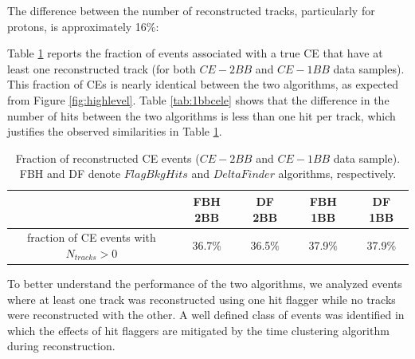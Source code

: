 The difference between the number of 
reconstructed tracks, particularly 
for protons, is approximately 16\%:  

Table \ref{tab:recoeffcele} reports 
the fraction of events associated 
with a true CE that have at least one 
reconstructed track (for both 
$CE-2BB$ and $CE-1BB$ data samples). 
This fraction of CEs is nearly identical 
between the two algorithms, 
as expected from Figure \ref{fig:highlevel}.
Table \ref{tab:1bbcele} shows 
that the difference in the number of 
hits between the two algorithms 
is less than one hit per track, which 
justifies the observed similarities in 
Table \ref{tab:recoeffcele}.



\begin{center}
    \begin{table}[h!]
    \centering
    \renewcommand{\arraystretch}{1.}
    \begin{tabular}{| c | c | c | c | c |} 
    \hline
    & FBH 2BB & DF 2BB & FBH 1BB & DF 1BB  \\
    \hline
    fraction of CE events with $N_{tracks}>0$ & 36.7\% & 36.5\% & 37.9\% & 37.9\%\\
    \hline
    \end{tabular}
    \caption{Fraction of reconstructed CE events ($CE-2BB$ and $CE-1BB$ data sample). FBH and DF denote  
    $FlagBkgHits$ and $DeltaFinder$ algorithms, respectively.}
    \label{tab:recoeffcele}
\end{table}
\end{center}

To better understand the performance of the 
two algorithms, 
we analyzed events where at least one 
track was reconstructed 
using one hit flagger while no tracks 
were reconstructed 
with the other. A well defined class 
of events was identified in 
which the effects of hit flaggers are 
mitigated by the time 
clustering algorithm during reconstruction.

